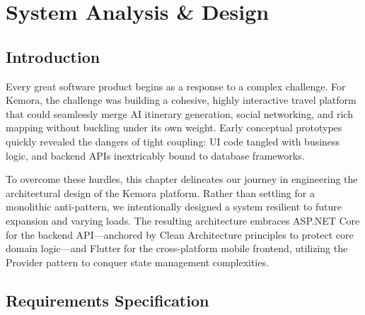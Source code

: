 \chapter{System Analysis \& Design}

\section{Introduction}
Every great software product begins as a response to a complex challenge. For Kemora, the challenge was building a cohesive, highly interactive travel platform that could seamlessly merge AI itinerary generation, social networking, and rich mapping without buckling under its own weight. Early conceptual prototypes quickly revealed the dangers of tight coupling: UI code tangled with business logic, and backend APIs inextricably bound to database frameworks. 

To overcome these hurdles, this chapter delineates our journey in engineering the architectural design of the Kemora platform. Rather than settling for a monolithic anti-pattern, we intentionally designed a system resilient to future expansion and varying loads. The resulting architecture embraces ASP.NET Core \cite{aspnetcore} for the backend API—anchored by Clean Architecture \cite{cleanarchitecture} principles to protect core domain logic—and Flutter \cite{flutter} for the cross-platform mobile frontend, utilizing the Provider pattern \cite{providerpattern} to conquer state management complexities.

\section{Requirements Specification}

